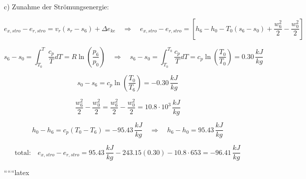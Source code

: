c) Zunahme der Strömungsenergie:

\[
e_{x,stro} - e_{r,stro} = v_r (s_{r} - s_{6}) + \Delta e_{ke} \quad \Rightarrow \quad e_{x,stro} - e_{r,stro} = \left[ h_6 - h_0 - T_0 (s_6 - s_0) + \frac{w_6^2}{2} - \frac{w_0^2}{2} \right]
\]

\[
s_6 - s_0 = \int_{T_0}^{T} \frac{c_p}{T} dT = R \ln \left( \frac{p_6}{p_0} \right) \quad \Rightarrow \quad s_6 - s_0 = \int_{T_0}^{T_0} \frac{c_p}{T} dT = c_p \ln \left( \frac{T_0}{T_0} \right) = 0.30 \, \frac{kJ}{kg}
\]

\[
s_0 - s_6 = c_p \ln \left( \frac{T_0}{T_6} \right) = -0.30 \, \frac{kJ}{kg}
\]

\[
\frac{w_6^2}{2} - \frac{w_0^2}{2} = \frac{w_6^2}{2} - \frac{w_0^2}{2} = 10.8 \cdot 10^3 \, \frac{kJ}{kg}
\]

\[
h_0 - h_6 = c_p (T_0 - T_6) = -95.43 \, \frac{kJ}{kg} \quad \Rightarrow \quad h_6 - h_0 = 95.43 \, \frac{kJ}{kg}
\]

\[
\text{total:} \quad e_{x,stro} - e_{r,stro} = 95.43 \, \frac{kJ}{kg} - 243.15 \left( 0.30 \right) - 10.8 \cdot 653 = -96.41 \, \frac{kJ}{kg}
\]

``````latex